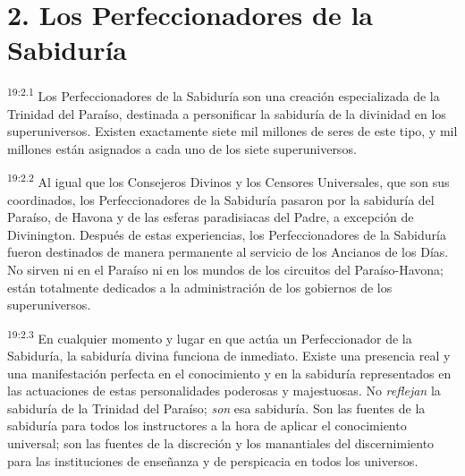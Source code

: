 \section*{2. Los Perfeccionadores de la Sabiduría}
\par
\textsuperscript{19:2.1} Los Perfeccionadores de la Sabiduría son una creación especializada de la Trinidad del Paraíso, destinada a personificar la sabiduría de la divinidad en los superuniversos. Existen exactamente siete mil millones de seres de este tipo, y mil millones están asignados a cada uno de los siete superuniversos.

\par
\textsuperscript{19:2.2} Al igual que los Consejeros Divinos y los Censores Universales, que son sus coordinados, los Perfeccionadores de la Sabiduría pasaron por la sabiduría del Paraíso, de Havona y de las esferas paradisiacas del Padre, a excepción de Divinington. Después de estas experiencias, los Perfeccionadores de la Sabiduría fueron destinados de manera permanente al servicio de los Ancianos de los Días. No sirven ni en el Paraíso ni en los mundos de los circuitos del Paraíso-Havona; están totalmente dedicados a la administración de los gobiernos de los superuniversos.

\par
\textsuperscript{19:2.3} En cualquier momento y lugar en que actúa un Perfeccionador de la Sabiduría, la sabiduría divina funciona de inmediato. Existe una presencia real y una manifestación perfecta en el conocimiento y en la sabiduría representados en las actuaciones de estas personalidades poderosas y majestuosas. No \textit{reflejan} la sabiduría de la Trinidad del Paraíso; \textit{son} esa sabiduría. Son las fuentes de la sabiduría para todos los instructores a la hora de aplicar el conocimiento universal; son las fuentes de la discreción y los manantiales del discernimiento para las instituciones de enseñanza y de perspicacia en todos los universos.

